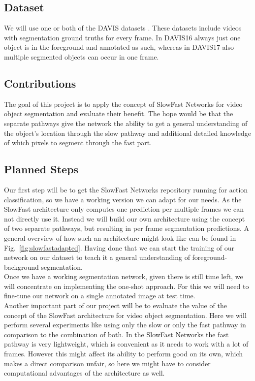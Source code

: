\documentclass[conference]{IEEEtran}
\begin{document}
\subsection{Dataset}
We will use one or both of the DAVIS datasets \cite{davis_2016,davis_2017}. These datasets include videos with segmentation ground truths for every frame. In DAVIS16 always just one object is in the foreground and annotated as such, whereas in DAVIS17 also multiple segmented objects can occur in one frame. 
\subsection{Contributions}
The goal of this project is to apply the concept of SlowFast Networks for video object segmentation and evaluate their benefit. The hope would be that the separate pathways give the network the ability to get a general understanding of the object’s location through the slow pathway and additional detailed knowledge of which pixels to segment through the fast part.

\subsection{Planned Steps}
Our first step will be to get the SlowFast Networks repository running for action classification, so we have a working version we can adapt for our needs. As the SlowFast architecture only computes one prediction per multiple frames we can not directly use it. Instead we will build our own architecture using the concept of two separate pathways, but resulting in per frame segmentation predictions. A general overview of how such an architecture might look like can be found in Fig.~\ref{fig:slowfastadapted}. Having done that we can start the training of our network on our dataset to teach it a general understanding of foreground-background segmentation.\\
Once we have a working segmentation network, given there is still time left, we will concentrate on implementing the one-shot approach. For this we will need to fine-tune our network on a single annotated image at test time.\\
Another important part of our project will be to evaluate the value of the concept of the SlowFast architecture for video object segmentation. Here we will perform several experiments like using only the slow or only the fast pathway in comparison to the combination of both. In the SlowFast Networks the fast pathway is very lightweight, which is convenient as it needs to work with a lot of frames. However this might affect its ability to perform good on its own, which makes a direct comparison unfair, so here we might have to consider computational advantages of the architecture as well.
\end{document}
